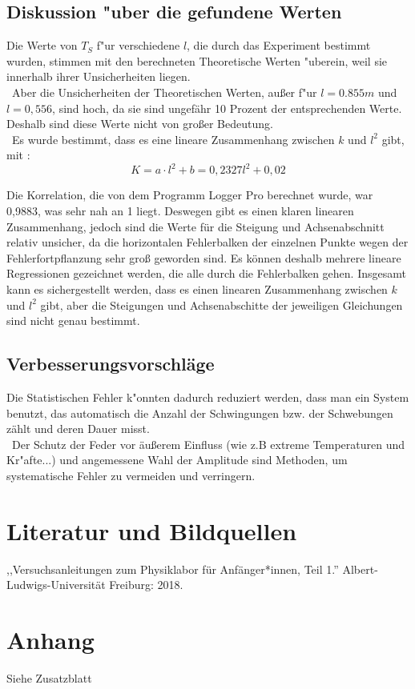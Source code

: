 \documentclass[11pt,a4paper]{article}
\begin{document}
\subsection{Diskussion "uber die gefundene Werten}
Die Werte von $T_S$ f"ur verschiedene $l$, die durch das Experiment bestimmt wurden, stimmen mit den berechneten Theoretische Werten "uberein, weil sie innerhalb ihrer Unsicherheiten liegen.
\\\
Aber die Unsicherheiten der Theoretischen Werten, außer f"ur $l=0.855 m$ und $l=0,556$, sind hoch, da sie sind ungefähr 10 Prozent der entsprechenden Werte. Deshalb sind diese Werte nicht von großer Bedeutung.
\\\
Es wurde bestimmt, dass es eine lineare Zusammenhang zwischen $k$ und $l^2$ gibt, mit :
$$ K = a\cdot l^2 +b = 0,2327 l^2 + 0,02 $$

Die Korrelation, die von dem Programm Logger Pro berechnet wurde, war 0,9883, was sehr nah an 1 liegt. Deswegen gibt es einen klaren linearen Zusammenhang, jedoch sind die Werte für die Steigung und Achsenabschnitt relativ unsicher, da die horizontalen Fehlerbalken der einzelnen Punkte wegen der Fehlerfortpflanzung sehr groß geworden sind. Es können deshalb mehrere lineare Regressionen gezeichnet werden, die alle durch die Fehlerbalken gehen. Insgesamt kann es sichergestellt werden, dass es einen linearen Zusammenhang zwischen $k$ und $l^2$ gibt, aber die Steigungen und Achsenabschitte der jeweiligen Gleichungen sind nicht genau bestimmt.
\subsection{Verbesserungsvorschläge}
Die Statistischen Fehler k"onnten dadurch reduziert werden, dass man ein System benutzt, das automatisch die Anzahl der Schwingungen bzw. der Schwebungen zählt und deren Dauer misst. 
\\\
Der Schutz der Feder vor äußerem Einfluss (wie z.B extreme Temperaturen und Kr"afte...) und angemessene Wahl der Amplitude sind Methoden, um systematische Fehler zu vermeiden und verringern.
\section{Literatur und Bildquellen}
,,Versuchsanleitungen zum Physiklabor für Anfänger*innen, Teil 1.''  Albert-Ludwigs-Universität Freiburg: 2018. 


\section{Anhang}
Siehe Zusatzblatt
\end{document}
